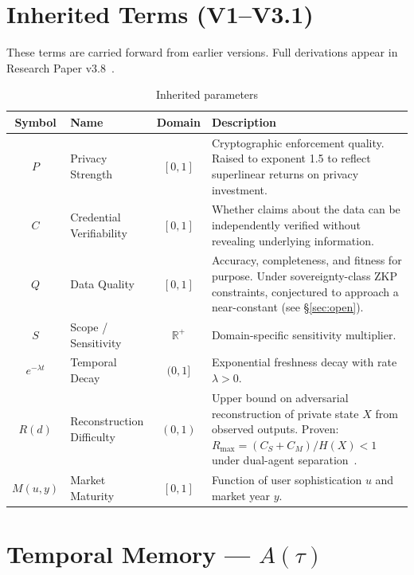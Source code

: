\documentclass[11pt,a4paper]{article}
\begin{document}
\section{Inherited Terms (V1--V3.1)}

These terms are carried forward from earlier versions. Full derivations appear in Research Paper v3.8~\cite{researchpaper}.

\begin{table}[h]
\centering
\caption{Inherited parameters}
\label{tab:inherited}
\begin{tabular}{@{}clcL{7.5cm}@{}}
\toprule
\textbf{Symbol} & \textbf{Name} & \textbf{Domain} & \textbf{Description} \\
\midrule
$P$ & Privacy Strength & $[0,1]$ & Cryptographic enforcement quality. Raised to exponent 1.5 to reflect superlinear returns on privacy investment. \\[4pt]
$C$ & Credential Verifiability & $[0,1]$ & Whether claims about the data can be independently verified without revealing underlying information. \\[4pt]
$Q$ & Data Quality & $[0,1]$ & Accuracy, completeness, and fitness for purpose. Under sovereignty-class ZKP constraints, conjectured to approach a near-constant (see \S\ref{sec:open}). \\[4pt]
$S$ & Scope / Sensitivity & $\mathbb{R}^+$ & Domain-specific sensitivity multiplier. \\[4pt]
$e^{-\lambda t}$ & Temporal Decay & $(0,1]$ & Exponential freshness decay with rate $\lambda > 0$. \\[4pt]
$R(d)$ & Reconstruction Difficulty & $(0,1)$ & Upper bound on adversarial reconstruction of private state $X$ from observed outputs. Proven: $R_{\max} = (C_S + C_M)/H(X) < 1$ under dual-agent separation~\cite{researchpaper}. \\[4pt]
$M(u,y)$ & Market Maturity & $[0,1]$ & Function of user sophistication $u$ and market year $y$. \\
\bottomrule
\end{tabular}
\end{table}

\section{Temporal Memory --- \texorpdfstring{$A(\tau)$}{A(tau)}}
\label{sec:temporal}
\end{document}
